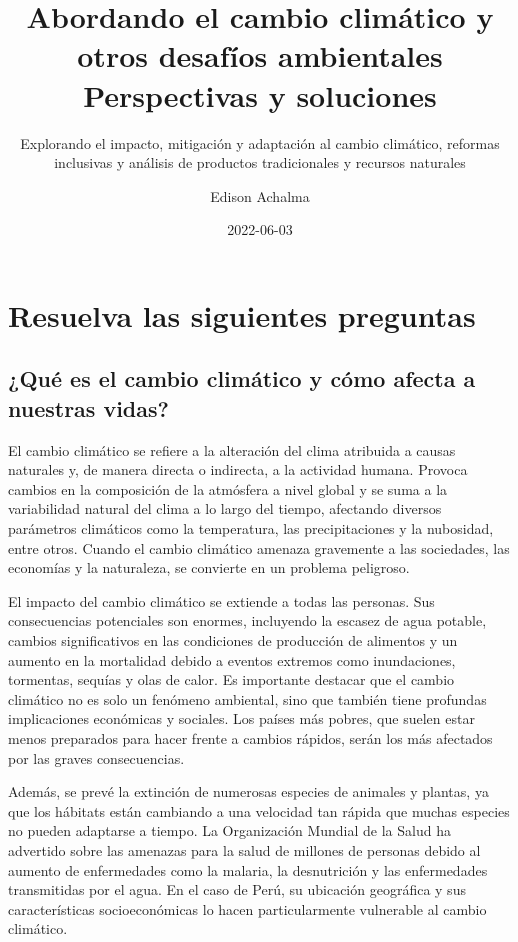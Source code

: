 \documentclass[
  a4paper,
]{article}
\title{Abordando el cambio climático y otros desafíos ambientales
Perspectivas y soluciones}
\subtitle{Explorando el impacto, mitigación y adaptación al cambio
climático, reformas inclusivas y análisis de productos tradicionales y
recursos naturales}
\author{Edison Achalma}
\date{2022-06-03}
\begin{document}
\maketitle
\ifdefined\Shaded\renewenvironment{Shaded}{\begin{tcolorbox}[borderline west={3pt}{0pt}{shadecolor}, sharp corners, enhanced, boxrule=0pt, frame hidden, interior hidden, breakable]}{\end{tcolorbox}}\fi

\hypertarget{resuelva-las-siguientes-preguntas}{%
\section{Resuelva las siguientes
preguntas}\label{resuelva-las-siguientes-preguntas}}

\hypertarget{quuxe9-es-el-cambio-climuxe1tico-y-cuxf3mo-afecta-a-nuestras-vidas}{%
\subsection{¿Qué es el cambio climático y cómo afecta a nuestras
vidas?}\label{quuxe9-es-el-cambio-climuxe1tico-y-cuxf3mo-afecta-a-nuestras-vidas}}

El cambio climático se refiere a la alteración del clima atribuida a
causas naturales y, de manera directa o indirecta, a la actividad
humana. Provoca cambios en la composición de la atmósfera a nivel global
y se suma a la variabilidad natural del clima a lo largo del tiempo,
afectando diversos parámetros climáticos como la temperatura, las
precipitaciones y la nubosidad, entre otros. Cuando el cambio climático
amenaza gravemente a las sociedades, las economías y la naturaleza, se
convierte en un problema peligroso.

El impacto del cambio climático se extiende a todas las personas. Sus
consecuencias potenciales son enormes, incluyendo la escasez de agua
potable, cambios significativos en las condiciones de producción de
alimentos y un aumento en la mortalidad debido a eventos extremos como
inundaciones, tormentas, sequías y olas de calor. Es importante destacar
que el cambio climático no es solo un fenómeno ambiental, sino que
también tiene profundas implicaciones económicas y sociales. Los países
más pobres, que suelen estar menos preparados para hacer frente a
cambios rápidos, serán los más afectados por las graves consecuencias.

Además, se prevé la extinción de numerosas especies de animales y
plantas, ya que los hábitats están cambiando a una velocidad tan rápida
que muchas especies no pueden adaptarse a tiempo. La Organización
Mundial de la Salud ha advertido sobre las amenazas para la salud de
millones de personas debido al aumento de enfermedades como la malaria,
la desnutrición y las enfermedades transmitidas por el agua. En el caso
de Perú, su ubicación geográfica y sus características socioeconómicas
lo hacen particularmente vulnerable al cambio climático.
\end{document}
